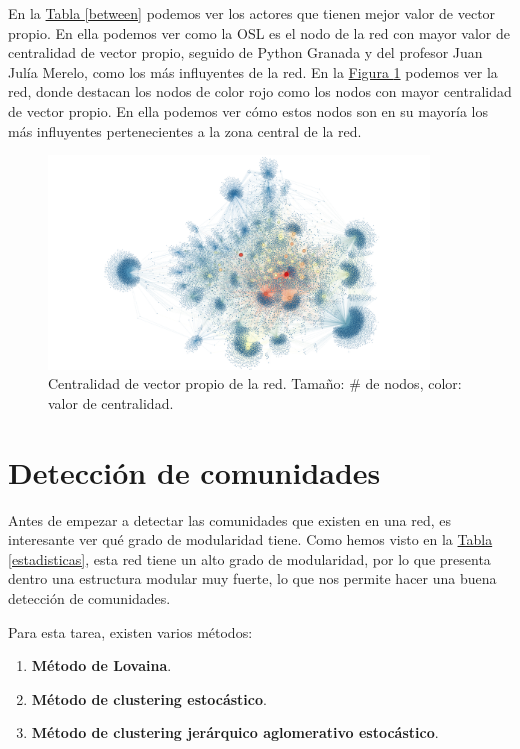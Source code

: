 \documentclass[paper=a4, fontsize=11pt]{article} %
\numberwithin{equation}{section} %
\numberwithin{figure}{section} %
\numberwithin{table}{section} %
\begin{document}
En la \hyperref[between]{Tabla \ref*{between}} podemos ver los actores que tienen mejor valor de vector propio. En ella podemos ver como la OSL es el nodo de la red con mayor valor de centralidad de vector propio, seguido de Python Granada y del profesor Juan Julía Merelo, como los más influyentes de la red. En la \hyperref[im6]{Figura \ref*{im6}} podemos ver la red, donde destacan los nodos de color rojo como los nodos con mayor centralidad de vector propio. En ella podemos ver cómo estos nodos son en su mayoría los más influyentes pertenecientes a la zona central de la red.

\begin{figure}[H]
  \centering
  \includegraphics[width=0.9\textwidth]{Visualizaciones/eigenvec}
  \caption{Centralidad de vector propio de la red. Tamaño: \# de nodos, color: valor de centralidad.}
  \label{im6}
\end{figure}

\section{Detección de comunidades}

Antes de empezar a detectar las comunidades que existen en una red, es interesante ver qué grado de modularidad tiene. Como hemos visto en la \hyperref[estadisticas]{Tabla \ref*{estadisticas}}, esta red tiene un alto grado de modularidad, por lo que presenta dentro una estructura modular muy fuerte, lo que nos permite hacer una buena detección de comunidades.

Para esta tarea, existen varios métodos:

\begin{enumerate}[$\bullet$]
  \item \textbf{Método de Lovaina}.
  \item \textbf{Método de clustering estocástico}.
  \item \textbf{Método de clustering jerárquico aglomerativo estocástico}.
\end{enumerate}
\end{document}
